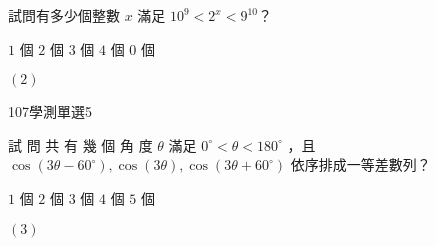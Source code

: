 \begin{QUESTIONS}
\begin{QUESTION}
        \begin{ExamAnsRateInfo}{}{}{}{}
        \end{ExamAnsRateInfo}
        \begin{QBODY}
            試問有多少個整數 $x$ 滿足 $10^{9} < 2^{x} < 9^{10}$？
            \begin{QOPS}
                \QOP $1$ 個
                \QOP $2$ 個
                \QOP $3$ 個
                \QOP $4$ 個
                \QOP $0$ 個
            \end{QOPS}
        \end{QBODY}
        \begin{QFROMS}
        \end{QFROMS}
        \begin{QTAGS}\end{QTAGS}
        \begin{QANS}
            $(2)$
        \end{QANS}
        \begin{QSOLLIST}
        \end{QSOLLIST}
        \begin{QEMPTYSPACE}
        \end{QEMPTYSPACE}
    \end{QUESTION}
    \begin{QUESTION}
        \begin{ExamInfo}{107}{學測}{單選}{5}
        \end{ExamInfo}
        \begin{ExamAnsRateInfo}{}{}{}{}
        \end{ExamAnsRateInfo}
        \begin{QBODY}
            試 問 共 有 幾 個 角 度 $\theta$ 滿足 $0^\circ < \theta < 180^\circ$ ，且 $\cos(3\theta-60^\circ), \cos(3\theta), \cos(3\theta +60^\circ) $ 依序排成一等差數列？
            \begin{QOPS}
                \QOP $1$ 個
                \QOP $2$ 個
                \QOP $3$ 個
                \QOP $4$ 個
                \QOP $5$ 個
            \end{QOPS}            
        \end{QBODY}
        \begin{QFROMS}
        \end{QFROMS}
        \begin{QTAGS}\end{QTAGS}
        \begin{QANS}
            $(3)$
        \end{QANS}

\end{QUESTION}
\end{QUESTIONS}
